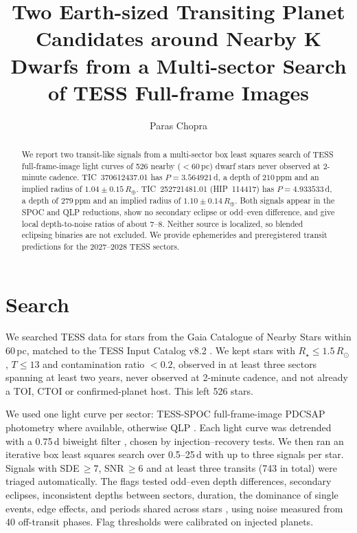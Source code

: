 \documentclass{aastex701}
\begin{document}
\title{Two Earth-sized Transiting Planet Candidates around Nearby K Dwarfs from a Multi-sector Search of TESS Full-frame Images}

\author{Paras Chopra}

\begin{abstract}
We report two transit-like signals from a multi-sector box least squares search of TESS full-frame-image light curves of 526 nearby ($<60$\,pc) dwarf stars never observed at 2-minute cadence. TIC~370612437.01 has $P=3.564921$\,d, a depth of $210$\,ppm and an implied radius of $1.04\pm0.15\,R_\oplus$. TIC~252721481.01 (HIP~114417) has $P=4.933533$\,d, a depth of $279$\,ppm and an implied radius of $1.10\pm0.14\,R_\oplus$. Both signals appear in the SPOC and QLP reductions, show no secondary eclipse or odd--even difference, and give local depth-to-noise ratios of about 7--8. Neither source is localized, so blended eclipsing binaries are not excluded. We provide ephemerides and preregistered transit predictions for the 2027--2028 TESS sectors.
\end{abstract}


\section{Search}
We searched TESS \citep{Ricker2015} data for stars from the Gaia Catalogue of Nearby Stars \citep{GCNS2021} within 60\,pc, matched to the TESS Input Catalog v8.2 \citep{Stassun2019}. We kept stars with $R_\star\le1.5\,R_\odot$, $T\le13$ and contamination ratio $<0.2$, observed in at least three sectors spanning at least two years, never observed at 2-minute cadence, and not already a TOI, CTOI or confirmed-planet host. This left 526 stars.

We used one light curve per sector: TESS-SPOC full-frame-image PDCSAP photometry \citep{Caldwell2020} where available, otherwise QLP \citep{Huang2020}. Each light curve was detrended with a 0.75\,d biweight filter \citep{Hippke2019}, chosen by injection--recovery tests. We then ran an iterative box least squares search \citep{Kovacs2002} over 0.5--25\,d with up to three signals per star. Signals with SDE\,$\ge7$, SNR\,$\ge6$ and at least three transits (743 in total) were triaged automatically. The flags tested odd--even depth differences, secondary eclipses, inconsistent depths between sectors, duration, the dominance of single events, edge effects, and periods shared across stars \citep[cf.][]{Twicken2018}, using noise measured from 40 off-transit phases. Flag thresholds were calibrated on injected planets.
\end{document}
